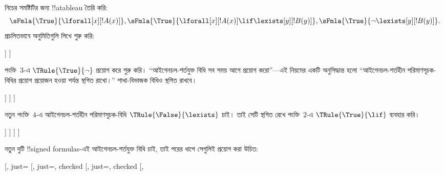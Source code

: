 \documentclass[../../../include/open-logic-section]{subfiles}
\begin{document}
\begin{ex}
নিচের সমষ্টিটির জন্য !!a{tableau} তৈরি করি:
\[
\sFmla{\True}{\lforall[x][!A(x)]}, \sFmla{\True}{\lforall[x][!A(x)]
  \lif \lexists[y][!B(y)]}, \sFmla{\True}{\lnot\lexists[y][!B(y)]}.
\]
প্রচলিতভাবে অনুমিতিগুলি লিখে শুরু করি:
\begin{oltableau}
  [\sFmla{\True}{\lforall[x][\formula{A}(x)]}, just=\TAss
    [\sFmla{\True}{\lforall[x][\formula{A}(x)] \lif
        \lexists[y][\formula{B}(y)]}, just=\TAss
      [\sFmla{\True}{\lnot\lexists[y][\formula{B}(y)]}, just=\TAss
      ]
    ]
  ]
\end{oltableau}
পংক্তি~$3$-এ $\TRule{\True}{\lnot}$ প্রয়োগ করে শুরু করি।
“আইগেনচল-শর্তযুক্ত বিধি সব সময় আগে প্রয়োগ করো”—এই নিয়মের একটি
অনুসিদ্ধান্ত হলো “আইগেনচল-শর্তহীন পরিমাণসূচক-বিধির প্রয়োগ প্রয়োজন
হওয়া পর্যন্ত স্থগিত রাখো।” শাখা-বিভাজক বিধিও স্থগিত রাখবে।
\begin{oltableau}
  [\sFmla{\True}{\lforall[x][\formula{A}(x)]}, just=\TAss
    [\sFmla{\True}{\lforall[x][\formula{A}(x)] \lif
        \lexists[y][\formula{B}(y)]}, just=\TAss
      [\sFmla{\True}{\lnot\lexists[y][\formula{B}(y)]}, just=\TAss, checked
        [\sFmla{\False}{\lexists[y][\formula{B}(y)]}, just={\TRule{\True}{\lnot}[3]}]
      ]
    ]
  ]
\end{oltableau}
নতুন পংক্তি~$4$-এ আইগেনচল-শর্তহীন পরিমাণসূচক-বিধি
$\TRule{\False}{\lexists}$ চাই। তাই সেটি স্থগিত রেখে পংক্তি~$2$-এ
$\TRule{\True}{\lif}$ ব্যবহার করি।
\begin{oltableau}
  [\sFmla{\True}{\lforall[x][\formula{A}(x)]}, just=\TAss
    [\sFmla{\True}{\lforall[x][\formula{A}(x)] \lif
        \lexists[y][\formula{B}(y)]}, just=\TAss, checked
      [\sFmla{\True}{\lnot\lexists[y][\formula{B}(y)]}, just=\TAss, checked
        [\sFmla{\False}{\lexists[y][\formula{B}(y)]},
          just={\TRule{\True}{\lnot}[3]},
          [\sFmla{\False}{\lforall[x][\formula{A}(x)]}, just={\TRule{\True}{\lif}[2]}]
          [\sFmla{\True}{\lexists[y][\formula{B}(y)]}, just={\TRule{\True}{\lif}[2]}]
        ]
      ]
    ]
  ]
\end{oltableau}
নতুন দুটি !!{signed formula}s-এই আইগেনচল-শর্তযুক্ত বিধি চাই, তাই
পরের ধাপে সেগুলিই প্রয়োগ করা উচিত:
\begin{oltableau}
  [\sFmla{\True}{\lforall[x][\formula{A}(x)]}, just=\TAss
    [\sFmla{\True}{\lforall[x][\formula{A}(x)] \lif
        \lexists[y][\formula{B}(y)]}, just=\TAss, checked
      [\sFmla{\True}{\lnot\lexists[y][\formula{B}(y)]}, just=\TAss, checked
        [\sFmla{\False}{\lexists[y][\formula{B}(y)]},

\end{oltableau}
\end{ex}
\end{document}
